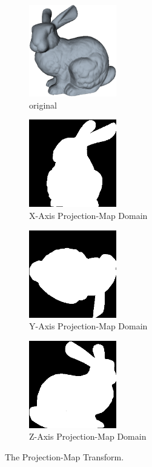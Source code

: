 \begin{figure}[!htb]
        \centering
        \begin{subfigure}[b]{1.5in}
                \includegraphics[width=1.5in]{images/ch2/bunny}
                \caption{original}
                \label{fig:bunnyOrigAA2}
        \end{subfigure}%
        \begin{subfigure}[b]{1.5in}
                \includegraphics[width=1.5in]{images/methodology/FVR/xaxis}
                \caption{X-Axis Projection-Map Domain}
                \label{fig:xaxPMDOM}
        \end{subfigure}
        \begin{subfigure}[b]{1.5in}
                \includegraphics[width=1.5in]{images/methodology/FVR/yaxis}
                \caption{Y-Axis Projection-Map Domain}
                \label{fig:yaxPMDOM}
        \end{subfigure}%
        \begin{subfigure}[b]{1.5in}
                \includegraphics[width=1.5in]{images/methodology/FVR/zaxis}
                \caption{Z-Axis Projection-Map Domain}
                \label{fig:zaxPMDOM}
        \end{subfigure}
        \caption{The Projection-Map Transform.}
       \label{fig:pmtExample}
\end{figure}


